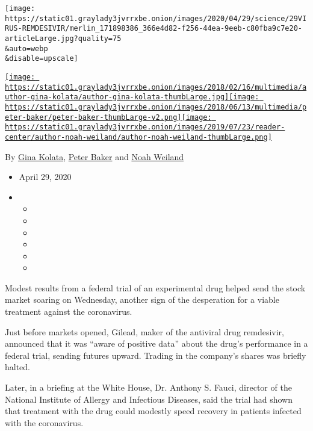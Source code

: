 \texttt{[image: https://static01.graylady3jvrrxbe.onion/images/2020/04/29/science/29VIRUS-REMDESIVIR/merlin\_171898386\_366e4d82-f256-44ea-9eeb-c80fba9c7e20-articleLarge.jpg?quality=75\\\&auto=webp\\\&disable=upscale]}

\href{https://www.nytimes3xbfgragh.onion/by/gina-kolata}{\texttt{[image: https://static01.graylady3jvrrxbe.onion/images/2018/02/16/multimedia/author-gina-kolata/author-gina-kolata-thumbLarge.jpg]}}\href{https://www.nytimes3xbfgragh.onion/by/peter-baker}{\texttt{[image: https://static01.graylady3jvrrxbe.onion/images/2018/06/13/multimedia/peter-baker/peter-baker-thumbLarge-v2.png]}}\href{https://www.nytimes3xbfgragh.onion/by/noah-weiland}{\texttt{[image: https://static01.graylady3jvrrxbe.onion/images/2019/07/23/reader-center/author-noah-weiland/author-noah-weiland-thumbLarge.png]}}

By \href{https://www.nytimes3xbfgragh.onion/by/gina-kolata}{Gina
Kolata}, \href{https://www.nytimes3xbfgragh.onion/by/peter-baker}{Peter
Baker} and
\href{https://www.nytimes3xbfgragh.onion/by/noah-weiland}{Noah Weiland}

\begin{itemize}
\item
  April 29, 2020
\item
  \begin{itemize}
  \item
  \item
  \item
  \item
  \item
  \item
  \end{itemize}
\end{itemize}

Modest results from a federal trial of an experimental drug helped send
the stock market soaring on Wednesday, another sign of the desperation
for a viable treatment against the coronavirus.

Just before markets opened, Gilead, maker of the antiviral drug
remdesivir, announced that it was ``aware of positive data'' about the
drug's performance in a federal trial, sending futures upward. Trading
in the company's shares was briefly halted.

Later, in a briefing at the White House, Dr. Anthony S. Fauci, director
of the National Institute of Allergy and Infectious Diseases, said the
trial had shown that treatment with the drug could modestly speed
recovery in patients infected with the coronavirus.

